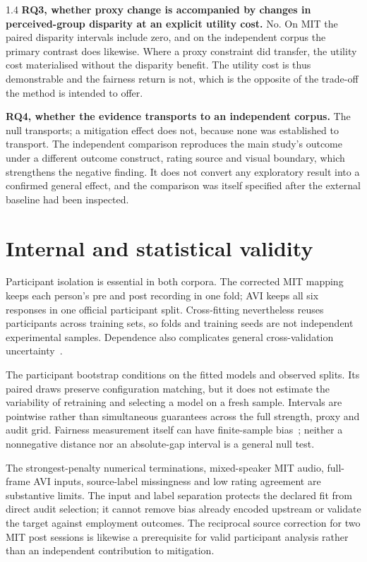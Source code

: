 \begin{spacing}{1.4}
\textbf{RQ3, whether proxy change is accompanied by changes in perceived-group disparity at
an explicit utility cost.} No. On MIT the paired disparity intervals include zero, and on
the independent corpus the primary contrast does likewise. Where a proxy constraint did
transfer, the utility cost materialised without the disparity benefit. The utility cost is
thus demonstrable and the fairness return is not, which is the opposite of the trade-off the
method is intended to offer.

\textbf{RQ4, whether the evidence transports to an independent corpus.} The null transports;
a mitigation effect does not, because none was established to transport. The independent
comparison reproduces the main study's outcome under a different outcome construct, rating
source and visual boundary, which strengthens the negative finding. It does not convert any
exploratory result into a confirmed general effect, and the comparison was itself specified
after the external baseline had been inspected.

\section{Internal and statistical validity}

Participant isolation is essential in both corpora. The corrected MIT mapping keeps
each person's pre and post recording in one fold; AVI keeps all six responses in one
official participant split. Cross-fitting nevertheless reuses participants across training
sets, so folds and training seeds are not independent experimental samples. Dependence
also complicates general cross-validation uncertainty~\cite{BengioGrandvalet2004}.

The participant bootstrap conditions on the fitted models and observed splits. Its
paired draws preserve configuration matching, but it does not estimate the variability
of retraining and selecting a model on a fresh sample. Intervals are pointwise rather
than simultaneous guarantees across the full strength, proxy and audit grid. Fairness
measurement itself can have finite-sample bias~\cite{Lum2022}; neither a nonnegative
distance nor an absolute-gap interval is a general null test.

The strongest-penalty numerical terminations, mixed-speaker MIT audio, full-frame AVI
inputs, source-label missingness and low rating agreement are substantive limits.
The input and label separation protects the declared fit from direct audit selection;
it cannot remove bias already encoded upstream or validate the target against
employment outcomes. The reciprocal source correction for two MIT post sessions is
likewise a prerequisite for valid participant analysis rather than an independent
contribution to mitigation.


\end{spacing}
